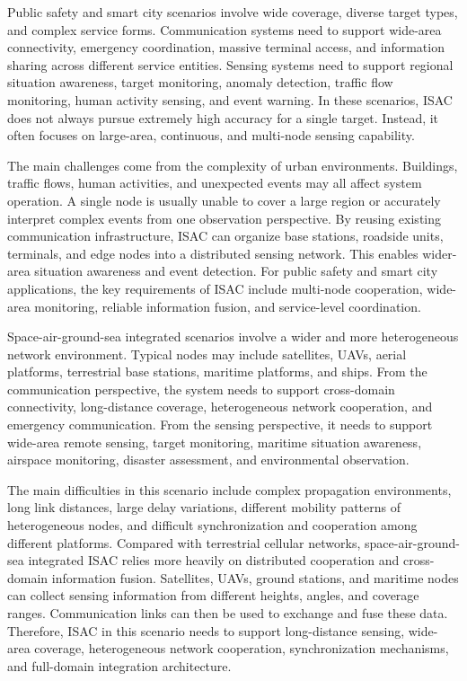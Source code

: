 
Public safety and smart city scenarios involve wide coverage, diverse target types, and complex service forms.
Communication systems need to support wide-area connectivity, emergency coordination, massive terminal access, and information sharing across different service entities.
Sensing systems need to support regional situation awareness, target monitoring, anomaly detection, traffic flow monitoring, human activity sensing, and event warning.
In these scenarios, ISAC does not always pursue extremely high accuracy for a single target.
Instead, it often focuses on large-area, continuous, and multi-node sensing capability.

The main challenges come from the complexity of urban environments.
Buildings, traffic flows, human activities, and unexpected events may all affect system operation.
A single node is usually unable to cover a large region or accurately interpret complex events from one observation perspective.
By reusing existing communication infrastructure, ISAC can organize base stations, roadside units, terminals, and edge nodes into a distributed sensing network.
This enables wider-area situation awareness and event detection.
For public safety and smart city applications, the key requirements of ISAC include multi-node cooperation, wide-area monitoring, reliable information fusion, and service-level coordination.


Space-air-ground-sea integrated scenarios involve a wider and more heterogeneous network environment.
Typical nodes may include satellites, UAVs, aerial platforms, terrestrial base stations, maritime platforms, and ships.
From the communication perspective, the system needs to support cross-domain connectivity, long-distance coverage, heterogeneous network cooperation, and emergency communication.
From the sensing perspective, it needs to support wide-area remote sensing, target monitoring, maritime situation awareness, airspace monitoring, disaster assessment, and environmental observation.

The main difficulties in this scenario include complex propagation environments, long link distances, large delay variations, different mobility patterns of heterogeneous nodes, and difficult synchronization and cooperation among different platforms.
Compared with terrestrial cellular networks, space-air-ground-sea integrated ISAC relies more heavily on distributed cooperation and cross-domain information fusion.
Satellites, UAVs, ground stations, and maritime nodes can collect sensing information from different heights, angles, and coverage ranges.
Communication links can then be used to exchange and fuse these data.
Therefore, ISAC in this scenario needs to support long-distance sensing, wide-area coverage, heterogeneous network cooperation, synchronization mechanisms, and full-domain integration architecture.

